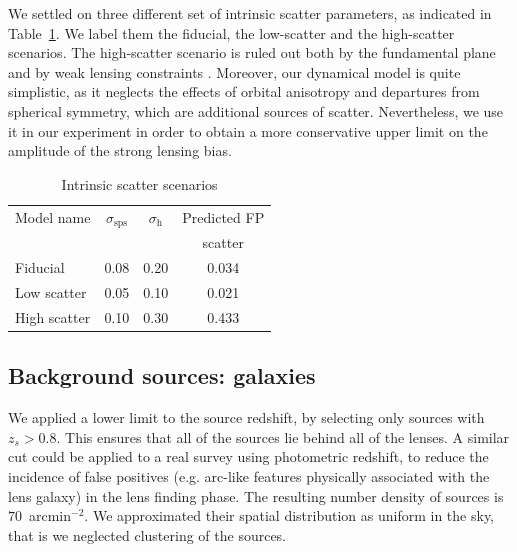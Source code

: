 \documentclass{aa}
\def\Tref#1{Table~\ref{#1}\xspace}
\newcommand{\ale}[1]{\textcolor{red}{\textbf{[Ale: #1]}}}
\begin{document}
We settled on three different set of intrinsic scatter parameters, as indicated in \Tref{tab:scatter}. We label them the fiducial, the low-scatter and the high-scatter scenarios.
The high-scatter scenario is ruled out both by the fundamental plane and by weak lensing constraints \citep{Son++22}. 
Moreover, our dynamical model is quite simplistic, as it neglects the effects of orbital anisotropy and departures from spherical symmetry, which are additional sources of scatter. 
Nevertheless, we use it in our experiment in order to obtain a more conservative upper limit on the amplitude of the strong lensing bias.
\begin{table}
\caption{Intrinsic scatter scenarios}
\label{tab:scatter}
\begin{tabular}{lccc}
\hline
\hline
Model name & $\sigma_{\mathrm{sps}}$ & $\sigma_{\mathrm{h}}$ & Predicted FP \\
 & & & scatter \\
\hline
Fiducial & 0.08 & 0.20 & 0.034 \\
Low scatter & 0.05 & 0.10 & 0.021 \\
High scatter & 0.10 & 0.30 & 0.433 \\
\end{tabular}
\end{table}


\subsection{Background sources: galaxies}\label{ssec:sources}

We applied a lower limit to the source redshift, by selecting only sources with $z_s > 0.8$.
This ensures that all of the sources lie behind all of the lenses.
A similar cut could be applied to a real survey using photometric redshift, to reduce the incidence of false positives (e.g. arc-like features physically associated with the lens galaxy) in the lens finding phase.
The resulting number density of sources is $70$~arcmin$^{-2}$.
We approximated their spatial distribution as uniform in the sky, that is we neglected clustering of the sources.
\end{document}
